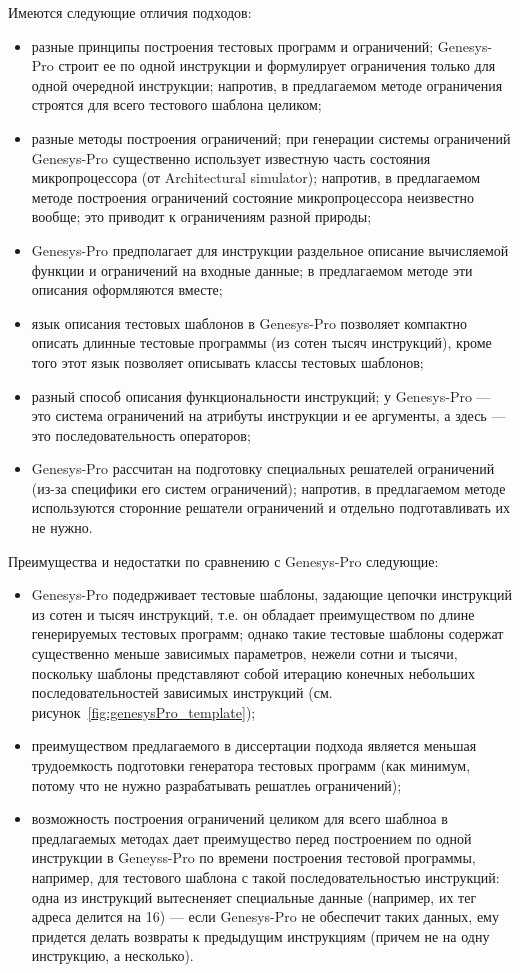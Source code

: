 Имеются следующие отличия подходов:
\begin{itemize}
    \item разные принципы построения тестовых программ и ограничений; Genesys-Pro строит ее по одной инструкции и формулирует ограничения только для одной очередной инструкции; напротив, в предлагаемом методе ограничения строятся для всего тестового шаблона целиком;
    \item разные методы построения ограничений; при генерации системы ограничений Genesys-Pro существенно использует известную часть состояния микропроцессора (от Architectural simulator); напротив, в предлагаемом методе построения ограничений состояние микропроцессора неизвестно вообще; это приводит к ограничениям разной природы;
    \item Genesys-Pro предполагает для инструкции раздельное описание вычисляемой функции и ограничений на входные данные; в предлагаемом методе эти описания оформляются вместе;
    \item язык описания тестовых шаблонов в Genesys-Pro позволяет компактно описать длинные тестовые программы (из сотен тысяч инструкций), кроме того этот язык позволяет описывать классы тестовых шаблонов;
    \item разный способ описания функциональности инструкций; у Genesys-Pro --- это система ограничений на атрибуты инструкции и ее аргументы, а здесь --- это последовательность операторов;
    \item Genesys-Pro рассчитан на подготовку специальных решателей ограничений (из-за специфики его систем ограничений); напротив, в предлагаемом методе используются сторонние решатели ограничений и отдельно подготавливать их не нужно.
\end{itemize}

Преимущества и недостатки по сравнению с Genesys-Pro следующие:
\begin{itemize}
    \item Genesys-Pro подедрживает тестовые шаблоны, задающие цепочки инструкций из сотен и тысяч инструкций, т.е. он обладает преимуществом по длине генерируемых тестовых программ; однако такие тестовые шаблоны содержат существенно меньше зависимых параметров, нежели сотни и тысячи, поскольку шаблоны представляют собой итерацию конечных небольших последовательностей зависимых инструкций (см. рисунок~\ref{fig:genesysPro_template});
    \item преимуществом предлагаемого в диссертации подхода является меньшая трудоемкость подготовки генератора тестовых программ (как минимум, потому что не нужно разрабатывать решатлеь ограничений);
    \item возможность построения ограничений целиком для всего шаблноа в предлагаемых методах дает преимущество перед построением по одной инструкции в Geneyss-Pro по времени построения тестовой программы, например, для тестового шаблона с такой последовательностью инструкций: одна из инструкций вытесненяет специальные данные (например, их тег адреса делится на 16) --- если Genesys-Pro не обеспечит таких данных, ему придется делать возвраты к предыдущим инструкциям (причем не на одну инструкцию, а несколько).
\end{itemize}

